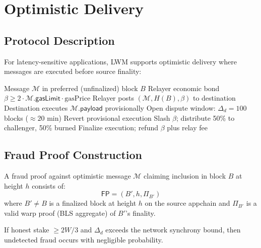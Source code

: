 \section{Optimistic Delivery}
\label{sec:optimistic}

\subsection{Protocol Description}

For latency-sensitive applications, LWM supports optimistic delivery where messages are executed before source finality:

\begin{algorithm}[H]
\caption{Optimistic Warp Delivery}
\label{alg:optimistic}
\begin{algorithmic}[1]
\Require Message $\mathcal{M}$ in preferred (unfinalized) block $B$
\Require Relayer economic bond $\beta \geq 2 \cdot \mathcal{M}.\mathsf{gasLimit} \cdot \text{gasPrice}$
\State Relayer posts $(\mathcal{M}, H(B), \beta)$ to destination
\State Destination executes $\mathcal{M}.\mathsf{payload}$ provisionally
\State Open dispute window: $\Delta_d = 100$ blocks ($\approx 20$ min)
    \State Revert provisional execution
    \State Slash $\beta$; distribute 50\% to challenger, 50\% burned
\Else
    \State Finalize execution; refund $\beta$ plus relay fee
\EndIf
\end{algorithmic}
\end{algorithm}

\subsection{Fraud Proof Construction}

\begin{definition}
A fraud proof against optimistic message $\mathcal{M}$ claiming inclusion in block $B$ at height $h$ consists of:
\begin{equation}
    \mathsf{FP} = (B', h, \Pi_{B'})
\end{equation}
where $B' \neq B$ is a finalized block at height $h$ on the source appchain and $\Pi_{B'}$ is a valid warp proof (BLS aggregate) of $B'$'s finality.
\end{definition}

\begin{theorem}
If honest stake $\geq 2W/3$ and $\Delta_d$ exceeds the network synchrony bound, then undetected fraud occurs with negligible probability.
\end{theorem}

